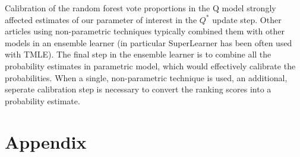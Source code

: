 \documentclass[]{article}\usepackage[]{graphicx}\usepackage[]{color}
\begin{document}


 


Calibration of the random forest vote proportions in the Q model strongly affected estimates of our parameter of interest in the $Q^*$ update step. Other articles using non-parametric techniques typically combined them with other models in an ensemble learner (in particular SuperLearner has been often used with TMLE). The final step in the ensemble learner is to combine all the probability estimates in parametric model, which would effectively calibrate the probabilities. When a single, non-parametric technique is used, an additional, seperate calibration step is necessary to convert the ranking scores into a probability estimate.


\printbibliography

\section{Appendix}
\end{document}
